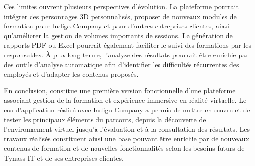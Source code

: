 Ces limites ouvrent plusieurs perspectives d'évolution. La plateforme pourrait
intégrer des personnages 3D personnalisés, proposer de nouveaux modules de
formation pour Indigo Company et pour d'autres entreprises clientes, ainsi
qu'améliorer la gestion de volumes importants de sessions. La génération de
rapports PDF ou Excel pourrait également faciliter le suivi des formations par
les responsables. À plus long terme, l'analyse des résultats pourrait être
enrichie par des outils d'analyse automatique afin d'identifier les difficultés
récurrentes des employés et d'adapter les contenus proposés.

En conclusion, \tynassit{} constitue une première version fonctionnelle d'une
plateforme associant gestion de la formation et expérience immersive en réalité
virtuelle. Le cas d'application réalisé avec Indigo Company a permis de mettre en
œuvre et de tester les principaux éléments du parcours, depuis la découverte de
l'environnement virtuel jusqu'à l'évaluation et à la consultation des résultats.
Les travaux réalisés constituent ainsi une base pouvant être enrichie par de
nouveaux contenus de formation et de nouvelles fonctionnalités selon les besoins
futurs de Tynass IT et de ses entreprises clientes.